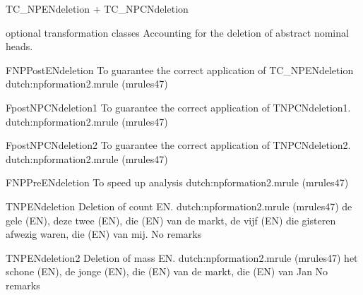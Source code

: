 \begin{mruleclass}{TC\_NPENdeletion + TC\_NPCNdeletion}
\begin{classdescr}
\kind optional transformation  classes
\classtask Accounting for the deletion of abstract nominal heads.
\classremarks
\begin{filters}
\begin{members}

\begin{member}
 FNPPostENdeletion
 To guarantee the correct application of 
TC\_NPENdeletion
\file dutch:npformation2.mrule (mrules47)
\end{member}
\begin{member}
 FpostNPCNdeletion1
 To guarantee the correct application of 
TNPCNdeletion1.
\file dutch:npformation2.mrule (mrules47)
\end{member}

\begin{member}
 FpostNPCNdeletion2
 To guarantee the correct application of 
TNPCNdeletion2.
\file dutch:npformation2.mrule (mrules47)
\end{member}
\end{members}

\end{filters}
\begin{speedrules}

\begin{members}
\begin{member}
 FNPPreENdeletion
 To speed up analysis
\file dutch:npformation2.mrule (mrules47)
\end{member}
\end{members}

\end{speedrules}
\noplannedrules
\norulesnotince
\begin{comments}
\end{comments}
\end{classdescr}



\begin{members}
\begin{member}
 TNPENdeletion
 Deletion of count EN.
\file dutch:npformation2.mrule (mrules47)
\semantics \nosemantics
\example de gele (EN), deze twee (EN), 
die (EN) van de markt,  de vijf (EN) die 
gisteren afwezig waren, die (EN) van mij.
\remarks No remarks
\end{member}
\begin{member}
 TNPENdeletion2
 Deletion of mass EN.
\file dutch:npformation2.mrule (mrules47)
\semantics \nosemantics
\example het schone (EN), de jonge (EN), 
                            die (EN) van de markt, die (EN) van Jan
\remarks No remarks
\end{member}



\end{members}
\end{mruleclass}
